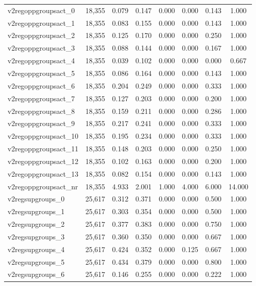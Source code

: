 \begin{table}[!htbp]
\begin{tabular}{@{\extracolsep{5pt}}lccccccc}
v2regoppgroupsact\_0 & 18,355 & 0.079 & 0.147 & 0.000 & 0.000 & 0.143 & 1.000 \\ 
v2regoppgroupsact\_1 & 18,355 & 0.083 & 0.155 & 0.000 & 0.000 & 0.143 & 1.000 \\ 
v2regoppgroupsact\_2 & 18,355 & 0.125 & 0.170 & 0.000 & 0.000 & 0.250 & 1.000 \\ 
v2regoppgroupsact\_3 & 18,355 & 0.088 & 0.144 & 0.000 & 0.000 & 0.167 & 1.000 \\ 
v2regoppgroupsact\_4 & 18,355 & 0.039 & 0.102 & 0.000 & 0.000 & 0.000 & 0.667 \\ 
v2regoppgroupsact\_5 & 18,355 & 0.086 & 0.164 & 0.000 & 0.000 & 0.143 & 1.000 \\ 
v2regoppgroupsact\_6 & 18,355 & 0.204 & 0.249 & 0.000 & 0.000 & 0.333 & 1.000 \\ 
v2regoppgroupsact\_7 & 18,355 & 0.127 & 0.203 & 0.000 & 0.000 & 0.200 & 1.000 \\ 
v2regoppgroupsact\_8 & 18,355 & 0.159 & 0.211 & 0.000 & 0.000 & 0.286 & 1.000 \\ 
v2regoppgroupsact\_9 & 18,355 & 0.217 & 0.241 & 0.000 & 0.000 & 0.333 & 1.000 \\ 
v2regoppgroupsact\_10 & 18,355 & 0.195 & 0.234 & 0.000 & 0.000 & 0.333 & 1.000 \\ 
v2regoppgroupsact\_11 & 18,355 & 0.148 & 0.203 & 0.000 & 0.000 & 0.250 & 1.000 \\ 
v2regoppgroupsact\_12 & 18,355 & 0.102 & 0.163 & 0.000 & 0.000 & 0.200 & 1.000 \\ 
v2regoppgroupsact\_13 & 18,355 & 0.082 & 0.154 & 0.000 & 0.000 & 0.143 & 1.000 \\ 
v2regoppgroupsact\_nr & 18,355 & 4.933 & 2.001 & 1.000 & 4.000 & 6.000 & 14.000 \\ 
v2regsupgroups\_0 & 25,617 & 0.312 & 0.371 & 0.000 & 0.000 & 0.500 & 1.000 \\ 
v2regsupgroups\_1 & 25,617 & 0.303 & 0.354 & 0.000 & 0.000 & 0.500 & 1.000 \\ 
v2regsupgroups\_2 & 25,617 & 0.377 & 0.383 & 0.000 & 0.000 & 0.750 & 1.000 \\ 
v2regsupgroups\_3 & 25,617 & 0.360 & 0.350 & 0.000 & 0.000 & 0.667 & 1.000 \\ 
v2regsupgroups\_4 & 25,617 & 0.424 & 0.352 & 0.000 & 0.125 & 0.667 & 1.000 \\ 
v2regsupgroups\_5 & 25,617 & 0.434 & 0.379 & 0.000 & 0.000 & 0.800 & 1.000 \\ 
v2regsupgroups\_6 & 25,617 & 0.146 & 0.255 & 0.000 & 0.000 & 0.222 & 1.000 \\ 

\end{tabular}
\end{table}
